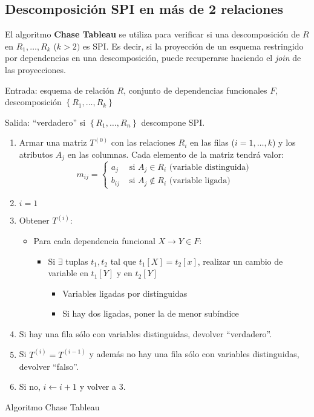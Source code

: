 \documentclass[a4paper, twoside]{article}
\begin{document}
\subsection{Descomposición SPI en más de 2 relaciones}

El algoritmo \textbf{Chase Tableau} se utiliza para verificar si una descomposición de $R$ en $R_{1},\ldots,R_{k}$ ($k>2)$ es SPI. Es decir, si la proyección de un esquema restringido por dependencias en una descomposición, puede recuperarse haciendo el \emph{join} de las proyecciones.

\begin{algorithm}[H]
	Entrada: esquema de relación $R$, conjunto de dependencias funcionales $F$, descomposición $\left\{ R_{1},\ldots,R_{k}\right\}$

	Salida: ``verdadero'' si $\left\{ R_{1},\ldots,R_{n}\right\} $ descompone SPI.
	\begin{enumerate}
		\item Armar una matriz $T^{(0)}$ con las relaciones $R_{i}$ en las filas ($i=1,\ldots,k$) y los atributos $A_{j}$ en las columnas. Cada elemento de la matriz tendrá valor:
\[
	m_{ij}=
	\begin{cases}
		a_{j} & \text{ si }A_{j}\in R_{i}\text{ (variable distinguida)}\\
		b_{ij} & \text{ si }A_{j}\not\in R_{i}\text{ (variable ligada)}
	\end{cases}
\]

		\item $i=1$

		\item Obtener $T^{(i)}$:
		\begin{itemize}
			\item Para cada dependencia funcional $X\to Y\in F$:
			\begin{itemize}
				\item Si $\exists$ tuplas $t_{1},t_{2}$ tal que $t_{1}[X]=t_{2}[x]$, realizar un cambio de variable en $t_{1}[Y]$ y en $t_{2}[Y]$
				\begin{itemize}
					\item Variables ligadas por distinguidas
					\item Si hay dos ligadas, poner la de menor subíndice
				\end{itemize}
			\end{itemize}
		\end{itemize}

		\item Si hay una fila sólo con variables distinguidas, devolver ``verdadero''.

		\item Si $T^{(i)}=T^{(i-1)}$ y además no hay una fila sólo con variables distinguidas, devolver ``falso''.
		
		\item Si no, $i\leftarrow i+1$ y volver a 3.
	\end{enumerate}
	\caption{Algoritmo Chase Tableau}
\end{algorithm}
\end{document}
